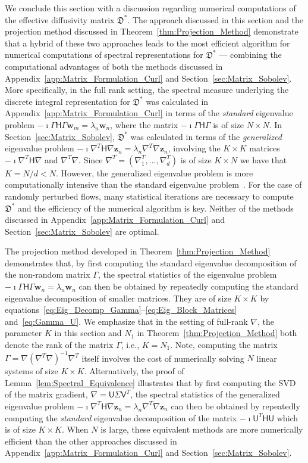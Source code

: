 \documentclass[english,12pt,jmp,graphicx]{revtex4-1}
\newcommand{\vecw}{\boldsymbol{w}}
\newcommand{\vecz}{\boldsymbol{z}}
\newcommand{\thmref}[1]{Theorem~\ref{#1}}
\newcommand{\lemref}[1]{Lemma~\ref{#1}}
\newcommand{\secref}[1]{Section~\ref{#1}}
\newcommand{\appref}[1]{Appendix~\ref{#1}}
\newcommand{\Dg}{\mathfrak{D}}
\newcommand{\Hm}{\mathsf{H}}
\newcommand{\Um}{\mathsf{U}}
\newcommand{\Vm}{\mathsf{V}}
\begin{document}
We conclude this section with a discussion regarding numerical
computations of the effective diffusivity matrix $\Dg^*$. The approach
discussed in this section and the projection method discussed in
\thmref{thm:Projection_Method} demonstrate that a hybrid of these two
approaches leads to the most efficient algorithm for numerical
computations of spectral representations for $\Dg^*$ --- combining the
computational advantages of both  the methods discussed in
\appref{app:Matrix_Formulation_Curl} and
\secref{sec:Matrix_Sobolev}. More specifically, in the full 
rank setting, the spectral measure underlying the discrete integral
representation for $\Dg^*$ was calculated in
\appref{app:Matrix_Formulation_Curl} in terms of the \emph{standard}
eigenvalue problem $-\imath\Gamma\Hm\Gamma\vecw_m=\lambda_n\vecw_n$, where the matrix
$-\imath\Gamma\Hm\Gamma$ is of size $N\times N$. In \secref{sec:Matrix_Sobolev}, 
$\Dg^*$ was calculated in terms of the \emph{generalized} eigenvalue 
problem $-\imath\nabla^T\Hm\nabla\vecz_n=\lambda_n\nabla^T\nabla\vecz_n$, involving the $K\times K$ matrices
$-\imath\nabla^T\Hm\nabla$ and $\nabla^T\nabla$. Since $\nabla^T=(\nabla_1^T,\ldots,\nabla_d^T)$ is of size $K\times N$
we have that $K=N/d<N$. However, the generalized eigenvalue problem is
more computationally intensive than the standard eigenvalue
problem~\cite{Parlett:1980}. For the case of randomly perturbed flows,
many statistical iterations are necessary to compute $\Dg^*$ and the
efficiency of the numerical algorithm is key. Neither of the methods
discussed in \appref{app:Matrix_Formulation_Curl} and
\secref{sec:Matrix_Sobolev} are optimal.




The projection method developed in \thmref{thm:Projection_Method}
demonstrates that, by first computing the standard eigenvalue
decomposition of the non-random matrix $\Gamma$, the spectral statistics of
the eigenvalue problem $-\imath\Gamma\Hm\Gamma\vecw_n=\lambda_n\vecw_n$ can then be
obtained by repeatedly computing the standard eigenvalue 
decomposition of smaller matrices. They are of size $K\times K$ by
equations~\eqref{eq:Eig_Decomp_Gamma}--\eqref{eq:Eig_Block_Matrices}
and~\eqref{eq:Gamma_U}. We emphasize that in the setting of full-rank
$\nabla$, the parameter $K$ in this section and $N_1$ in
\thmref{thm:Projection_Method} both denote the rank of the matrix
$\Gamma$, i.e., $K=N_1$. Note, computing the matrix
$\Gamma=\nabla(\nabla^T\nabla)^{-1}\nabla^T$ itself involves the cost
of numerically solving $N$ linear systems of size $K\times
K$. Alternatively, the proof of \lemref{lem:Spectral_Equivalence}
illustrates that by first computing the SVD of the matrix gradient,
$\nabla=\Um\Sigma\Vm^T$, the spectral statistics of the generalized
eigenvalue problem
$-\imath\nabla^T\Hm\nabla\vecz_n=\lambda_n\nabla^T\nabla\vecz_n$ can
then be obtained by repeatedly computing the \emph{standard}
eigenvalue decomposition of the matrix $-\imath\Um^T\Hm\Um$ which is
of size $K\times K$. When $N$ is large, these equivalent methods are
more numerically efficient than the other approaches discussed in
\appref{app:Matrix_Formulation_Curl} and \secref{sec:Matrix_Sobolev}.    
\end{document}
